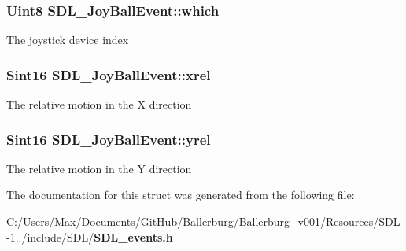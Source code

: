 \subsubsection[{which}]{\setlength{\rightskip}{0pt plus 5cm}Uint8 S\+D\+L\+\_\+\+Joy\+Ball\+Event\+::which}\label{struct_s_d_l___joy_ball_event_ae23a3dc77c0f327ec3597e68a4fa02ab}
The joystick device index 
\subsubsection[{xrel}]{\setlength{\rightskip}{0pt plus 5cm}Sint16 S\+D\+L\+\_\+\+Joy\+Ball\+Event\+::xrel}\label{struct_s_d_l___joy_ball_event_a959a8473aa1964e5e1778c27a9ffd261}
The relative motion in the X direction 
\subsubsection[{yrel}]{\setlength{\rightskip}{0pt plus 5cm}Sint16 S\+D\+L\+\_\+\+Joy\+Ball\+Event\+::yrel}\label{struct_s_d_l___joy_ball_event_a28ad48a9eb7a5d3ff62ccba09fcead76}
The relative motion in the Y direction 

The documentation for this struct was generated from the following file\+:\begin{DoxyCompactItemize}
\item 
C\+:/\+Users/\+Max/\+Documents/\+Git\+Hub/\+Ballerburg/\+Ballerburg\+\_\+v001/\+Resources/\+S\+D\+L-\/1../include/\+S\+D\+L/{\bf S\+D\+L\+\_\+events.\+h}\end{DoxyCompactItemize}
